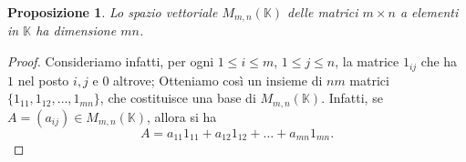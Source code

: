 \documentclass{article}
\theoremstyle{plain}
\newtheorem{prop}[thm]{Proposizione}
\theoremstyle{definition}
\newtheorem{exmp}{Esempio}[section]
\theoremstyle{remark}
\begin{document}
%
%
%    
%    
%    
%
%

\vspace{10pt}

\begin{bxthm}
\begin{prop}\label{quattroquindicisette}
    Lo spazio vettoriale \( M_{m,n}(\mathbb{K}) \) delle matrici \( m \times n \) a elementi in \( \mathbb{K} \) ha dimensione \( mn \). 
\end{prop}
\end{bxthm}
\begin{proof}
    Consideriamo infatti, per ogni \( 1 \leq i \leq m \), \( 1 \leq j \leq n \), la matrice \( 1_{ij} \) che ha \( 1 \) nel posto \( i, j \) e \( 0 \) altrove; 
    Otteniamo così un insieme di \( nm \) matrici \( \{1_{11}, 1_{12}, \ldots, 1_{mn}\} \), che costituisce una base di \( M_{m,n}(\mathbb{K}) \). 
    Infatti, se \( A = (a_{ij}) \in M_{m,n}(\mathbb{K}) \), allora si ha
    \[ A = a_{11}1_{11} + a_{12}1_{12} + \ldots + a_{mn}1_{mn}. \]
\end{proof}
\end{document}
